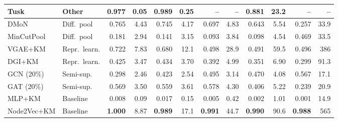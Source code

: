 \begin{table}[t]
\begin{tabular}{llrrrrrrrrrr}
Tusk & Other & 0.977 & 0.05 & 0.989 & 0.25 & -- & -- & 0.881 & 23.2 & -- & -- \\
\midrule
DMoN & Diff.\ pool & 0.765 & 4.43 & 0.745 & 4.17 & 0.697 & 4.83 & 0.643 & 5.54 & 0.257 & 33.9 \\
MinCutPool & Diff.\ pool & 0.181 & 2.94 & 0.141 & 3.15 & 0.093 & 3.84 & 0.098 & 4.54 & 0.469 & 33.5 \\
VGAE+KM & Repr.\ learn. & 0.722 & 7.83 & 0.680 & 12.1 & 0.498 & 28.9 & 0.491 & 59.5 & 0.496 & 386 \\
DGI+KM & Repr.\ learn. & 0.425 & 3.47 & 0.434 & 3.70 & 0.392 & 4.99 & 0.351 & 6.90 & 0.299 & 91.3 \\
GCN (20\%) & Semi-sup. & 0.298 & 2.46 & 0.423 & 2.54 & 0.495 & 3.14 & 0.470 & 4.08 & 0.567 & 17.1 \\
GAT (20\%) & Semi-sup. & 0.569 & 3.50 & 0.559 & 3.61 & 0.578 & 4.30 & 0.406 & 5.22 & 0.239 & 20.9 \\
MLP+KM & Baseline & 0.008 & 0.09 & 0.017 & 0.15 & 0.005 & 0.42 & 0.002 & 1.01 & 0.001 & 14.9 \\
Node2Vec+KM & Baseline & \textbf{1.000} & 8.87 & \textbf{0.989} & 17.1 & \textbf{0.991} & 44.7 & \textbf{0.990} & 90.6 & \textbf{0.988} & 565 \\
\bottomrule
\end{tabular}
\end{table}